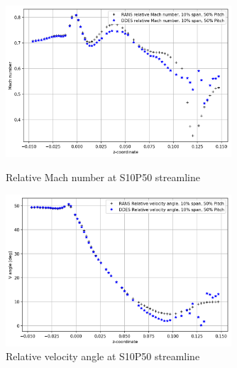 \begin{figure}[ht]
  \centering
  \includegraphics[width=0.75\textwidth]{Pictures/mach-rel-S10-P50.png}
  \caption{Relative Mach number at S10P50 streamline} \label{mach-rel-S10-P50}
  \vspace*{\floatsep}%
  \includegraphics[width=0.75\textwidth]{Pictures/vang-rel-S10-P50.png}
  \caption{Relative velocity angle at S10P50 streamline} \label{vang-rel-S10-P50}
\end{figure}


